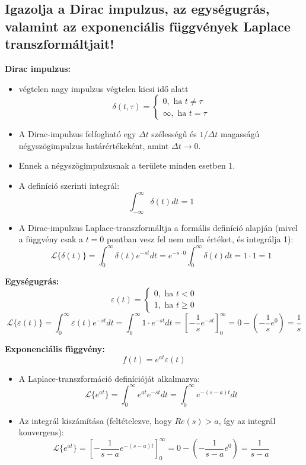 \subsection{Igazolja a Dirac impulzus, az egységugrás, valamint az exponenciális függvények Laplace transzformáltjait!}

\noindent \textbf{Dirac impulzus:}
\begin{itemize}
    \item végtelen nagy impulzus végtelen kicsi idő alatt
    $$ \delta(t, \tau) = \begin{cases} 0, \text{ ha } t \neq \tau \\ \infty, \text{ ha } t = \tau \end{cases} $$
    \item A Dirac-impulzus felfogható egy $\Delta t$ szélességű és $1/\Delta t$ magasságú négyszögimpulzus határértékeként, amint $\Delta t \to 0$.
    \item Ennek a négyszögimpulzusnak a területe minden esetben 1.
    \item A definíció szerinti integrál:
    $$ \int_{-\infty}^\infty \delta(t) dt = 1 $$
    \item A Dirac-impulzus Laplace-transzformáltja a formális definíció alapján (mivel a függvény csak a $t=0$ pontban vesz fel nem nulla értéket, és integrálja 1):
    $$ \mathcal{L}\{\delta(t)\} = \int_0^\infty \delta(t) e^{-st} dt = e^{-s \cdot 0} \int_0^\infty \delta(t) dt = 1 \cdot 1 = 1 $$
\end{itemize}

\noindent \textbf{Egységugrás:}
$$ \varepsilon(t) = \begin{cases} 0, \text{ ha } t < 0 \\ 1, \text{ ha } t \geq 0 \end{cases} $$
$$ \mathcal{L}\{\varepsilon(t)\} = \int_0^\infty \varepsilon(t) e^{-st} dt = \int_0^\infty 1 \cdot e^{-st} dt = \left[ -\frac{1}{s} e^{-st} \right]_0^\infty = 0 - \left( -\frac{1}{s} e^0 \right) = \frac{1}{s} $$

\noindent \textbf{Exponenciális függvény:}
$$ f(t) = e^{at} \varepsilon(t) $$
\begin{itemize}
    \item A Laplace-transzformáció definícióját alkalmazva:
    $$ \mathcal{L}\{e^{at}\} = \int_0^\infty e^{at} e^{-st} dt = \int_0^\infty e^{-(s-a)t} dt $$
    \item Az integrál kiszámítása (feltételezve, hogy $Re(s) > a$, így az integrál konvergens):
    $$ \mathcal{L}\{e^{at}\} = \left[ -\frac{1}{s-a} e^{-(s-a)t} \right]_0^\infty = 0 - \left( -\frac{1}{s-a} e^0 \right) = \frac{1}{s-a} $$
\end{itemize}
